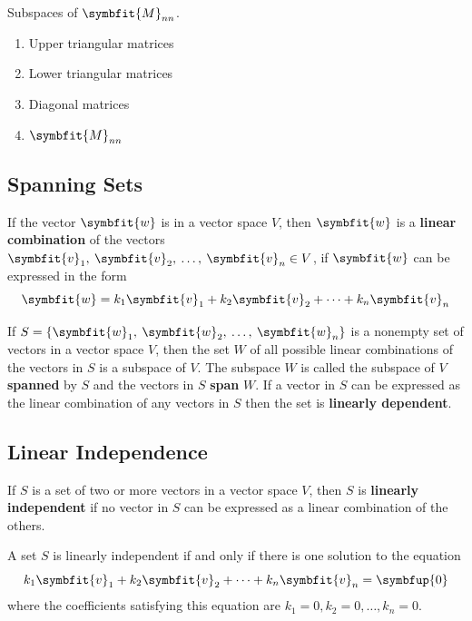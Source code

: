 \documentclass{article}
\begin{document}
	\begin{theorem}
		Subspaces of $\symbfit{M}_{nn}$.
		\begin{enumerate}
			\item Upper triangular matrices
			\item Lower triangular matrices
			\item Diagonal matrices
			\item $\symbfit{M}_{nn}$
		\end{enumerate}
	\end{theorem}
	\subsection{Spanning Sets}
	\begin{definition}
		If the vector $\symbfit{w}$ is in a vector space $V$, then $\symbfit{w}$ is a \textbf{linear combination} of the vectors $\symbfit{v}_1,\: \symbfit{v}_2,\: \dots,\: \symbfit{v}_n \in V$, if $\symbfit{w}$ can be expressed in the form
		\begin{equation*}
			\symbfit{w} = k_1 \symbfit{v}_1 + k_2 \symbfit{v}_2 + \cdots + k_n \symbfit{v}_n
		\end{equation*}
	\end{definition}
	\begin{theorem}
		If $S=\left\{ \symbfit{w}_1,\: \symbfit{w}_2,\: \dots,\: \symbfit{w}_n \right\}$ is a nonempty set of vectors in a vector space $V$, then the set $W$ of all possible linear combinations of the vectors in $S$ is a subspace of $V$. The subspace $W$ is called the subspace of $V$ \textbf{spanned} by $S$ and the vectors in $S$ \textbf{span} $W$. If a vector in $S$ can be expressed as the linear combination of any vectors in $S$ then the set is \textbf{linearly dependent}.
 	\end{theorem}
	\subsection{Linear Independence}
	\begin{definition}
		If $S$ is a set of two or more vectors in a vector space $V$, then $S$ is \textbf{linearly independent} if no vector in $S$ can be expressed as a linear combination of the others. 
	\end{definition}
	\begin{theorem}
		A set $S$ is linearly independent if and only if there is one solution to the equation
		\begin{equation*}
			k_1 \symbfit{v}_1 + k_2 \symbfit{v}_2 + \cdots + k_n \symbfit{v}_n = \symbfup{0}
		\end{equation*} 
		where the coefficients satisfying this equation are $k_1=0, k_2=0, \dots, k_n=0$.
	\end{theorem}
\end{document}
